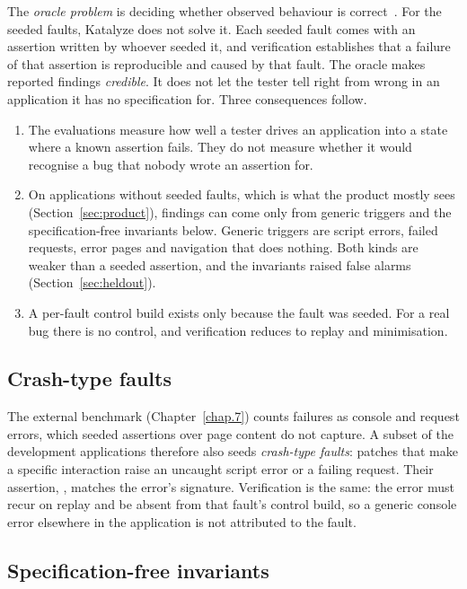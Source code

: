 The \emph{oracle problem} is deciding whether observed behaviour is
correct~\cite{barr2015oracle}. For the seeded faults, Katalyze does not solve it. Each
seeded fault comes with an assertion written by whoever seeded it, and verification
establishes that a failure of that assertion is reproducible and caused by that fault. The
oracle makes reported findings \emph{credible}. It does not let the tester tell right from
wrong in an application it has no specification for. Three consequences follow.
\begin{enumerate}[noitemsep]
  \item The evaluations measure how well a tester drives an application into a state where
        a known assertion fails. They do not measure whether it would recognise a bug that
        nobody wrote an assertion for.
  \item On applications without seeded faults, which is what the product mostly sees
        (Section~\ref{sec:product}), findings can come only from generic triggers and the
        specification-free invariants below. Generic triggers are script errors, failed
        requests, error pages and navigation that does nothing. Both kinds are weaker than
        a seeded assertion, and the invariants raised false alarms (Section~\ref{sec:heldout}).
  \item A per-fault control build exists only because the fault was seeded. For a real
        bug there is no control, and verification reduces to replay and minimisation.
\end{enumerate}

\subsection{Crash-type faults}
\label{sec:crash}

The external benchmark (Chapter~\ref{chap.7}) counts failures as console and request
errors, which seeded assertions over page content do not capture. A subset of the
development applications therefore also seeds \emph{crash-type faults}: patches that make a
specific interaction raise an uncaught script error or a failing request. Their assertion,
, matches the error's signature. Verification is the
same: the error must recur on replay and be absent from that fault's control build, so a
generic console error elsewhere in the application is not attributed to the fault.

\subsection{Specification-free invariants}

